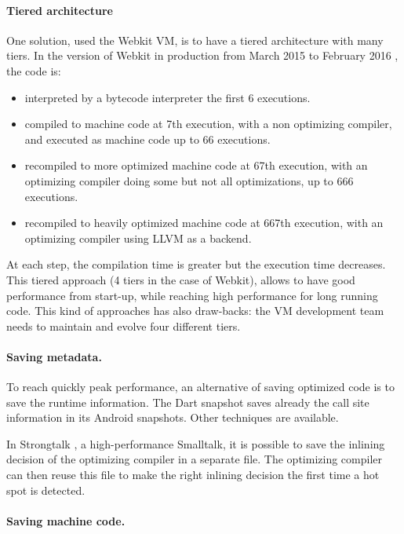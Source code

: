 \documentclass[a4paper,12pt,twoside]{../includes/ThesisStyle}
\begin{document}
\paragraph{Tiered architecture}
One solution, used the Webkit VM\cite{Webkit15}, is to have a tiered architecture with many tiers. In the version of Webkit in production from March 2015 to February 2016 \cite{Webkit15}, the code is:
\begin{itemize}
\item interpreted by a bytecode interpreter the first 6 executions.
\item compiled to machine code at 7th execution, with a non optimizing compiler, and executed as machine code up to 66 executions.
\item recompiled to more optimized machine code at 67th execution, with an optimizing compiler doing some but not all optimizations, up to 666 executions.
\item recompiled to heavily optimized machine code at 667th execution, with an optimizing compiler using LLVM as a backend.
\end{itemize}

At each step, the compilation time is greater but the execution time decreases. This tiered approach (4 tiers in the case of Webkit), allows to have good performance from start-up, while reaching high performance for long running code. This kind of approaches has also draw-backs: the VM development team needs to maintain and evolve four different tiers.

\paragraph{Saving metadata.}

To reach quickly peak performance, an alternative of saving optimized code is to save the runtime information. The Dart snapshot saves already the call site information in its Android snapshots. Other techniques are available.

In Strongtalk \cite{Sun06}, a high-performance Smalltalk, it is possible to save the inlining decision of the optimizing compiler in a separate file. The optimizing compiler can then reuse this file to make the right inlining decision the first time a hot spot is detected.

\paragraph{Saving machine code.}
\end{document}
